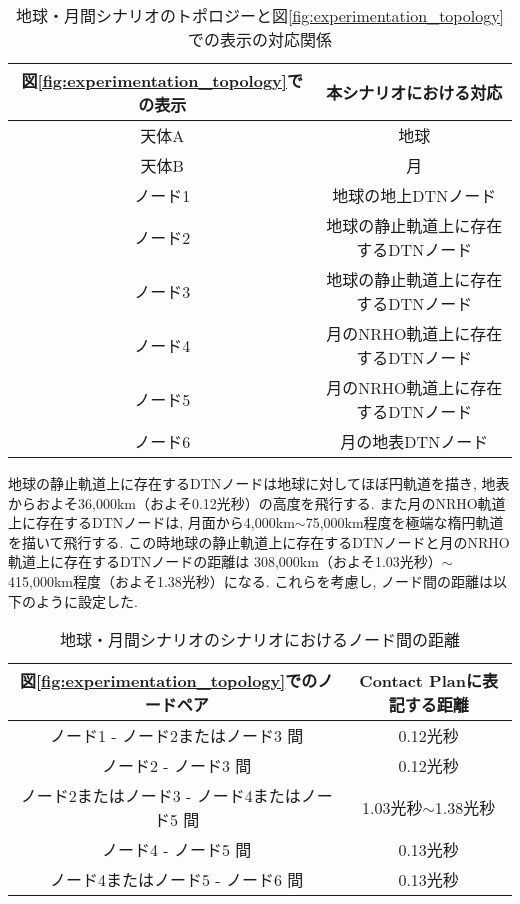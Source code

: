 \begin{table}[htbp]
    \centering
    \begin{tabular}{c|c}  \hline
        図\ref{fig:experimentation_topology}での表示 & 本シナリオにおける対応 \\ \hline\hline
        天体A & 地球 \\
        天体B & 月 \\
        ノード1 & 地球の地上DTNノード \\
        ノード2 & 地球の静止軌道上に存在するDTNノード \\
        ノード3 & 地球の静止軌道上に存在するDTNノード \\
        ノード4 & 月のNRHO軌道上に存在するDTNノード \\
        ノード5 & 月のNRHO軌道上に存在するDTNノード \\
        ノード6 & 月の地表DTNノード \\ \hline
    \end{tabular}
    \caption{地球・月間シナリオのトポロジーと図\ref{fig:experimentation_topology}での表示の対応関係}
    \label{table:earth_moon_scenario_topology}
\end{table}

地球の静止軌道上に存在するDTNノードは地球に対してほぼ円軌道を描き, 
地表からおよそ36,000km（およそ0.12光秒）の高度を飛行する. 
また月のNRHO軌道上に存在するDTNノードは,  月面から4,000km$\sim$75,000km程度を極端な楕円軌道を描いて飛行する. 
この時地球の静止軌道上に存在するDTNノードと月のNRHO軌道上に存在するDTNノードの距離は
308,000km（およそ1.03光秒）$\sim$415,000km程度（およそ1.38光秒）になる. 
これらを考慮し, ノード間の距離は以下のように設定した. 
\begin{table}[htbp]
    \centering
    \begin{tabular}{c|c}  \hline
        図\ref{fig:experimentation_topology}でのノードペア & Contact Planに表記する距離 \\ \hline\hline
        ノード1 - ノード2またはノード3 間　& 0.12光秒 \\
        ノード2 - ノード3 間 & 0.12光秒 \\
        ノード2またはノード3 - ノード4またはノード5  間 & 1.03光秒$\sim$1.38光秒 \\
        ノード4 - ノード5  間 & 0.13光秒 \\
        ノード4またはノード5 - ノード6  間 & 0.13光秒 \\ \hline
    \end{tabular}
    \caption{地球・月間シナリオのシナリオにおけるノード間の距離}
    \label{table:earth_moon_scenario_distance}
\end{table}


